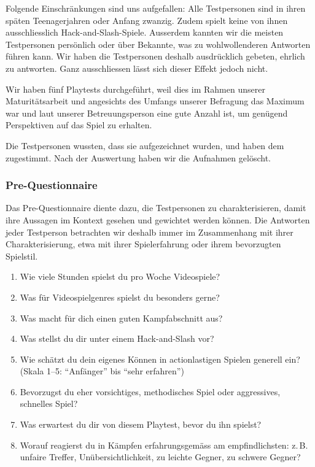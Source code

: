 \documentclass[../Main.tex]{subfiles}
\begin{document}
Folgende Einschränkungen sind uns aufgefallen: Alle Testpersonen sind in ihren späten Teenagerjahren oder Anfang zwanzig. Zudem spielt keine von ihnen ausschliesslich Hack-and-Slash-Spiele. Ausserdem kannten wir die meisten Testpersonen persönlich oder über Bekannte, was zu wohlwollenderen Antworten führen kann. Wir haben die Testpersonen deshalb ausdrücklich gebeten, ehrlich zu antworten. Ganz ausschliessen lässt sich dieser Effekt jedoch nicht.

Wir haben fünf Playtests durchgeführt, weil dies im Rahmen unserer Maturitätsarbeit und angesichts des Umfangs unserer Befragung das Maximum war und laut unserer Betreuungsperson eine gute Anzahl ist, um genügend Perspektiven auf das Spiel zu erhalten.

Die Testpersonen wussten, dass sie aufgezeichnet wurden, und haben dem zugestimmt. Nach der Auswertung haben wir die Aufnahmen gelöscht.

\subsubsection{Pre-Questionnaire} \label{sec:PreQuestionnaire}

Das Pre-Questionnaire diente dazu, die Testpersonen zu charakterisieren, damit ihre Aussagen im Kontext gesehen und gewichtet werden können. Die Antworten jeder Testperson betrachten wir deshalb immer im Zusammenhang mit ihrer Charakterisierung, etwa mit ihrer Spielerfahrung oder ihrem bevorzugten Spielstil.

\begin{enumerate}[label=\textbf{P\arabic*}, leftmargin=1.5cm, itemsep=0.5em]
    \item Wie viele Stunden spielst du pro Woche Videospiele?
    \item Was für Videospielgenres spielst du besonders gerne?
    \item Was macht für dich einen guten Kampfabschnitt aus?
    \item Was stellst du dir unter einem Hack-and-Slash vor?
    \item Wie schätzt du dein eigenes Können in actionlastigen Spielen generell ein? (Skala 1--5: \enquote{Anfänger} bis \enquote{sehr erfahren})
    \item Bevorzugst du eher vorsichtiges, methodisches Spiel oder aggressives, schnelles Spiel?
    \item Was erwartest du dir von diesem Playtest, bevor du ihn spielst?
    \item Worauf reagierst du in Kämpfen erfahrungsgemäss am empfindlichsten: z.\,B. unfaire Treffer, Unübersichtlichkeit, zu leichte Gegner, zu schwere Gegner?
\end{enumerate}
\end{document}
